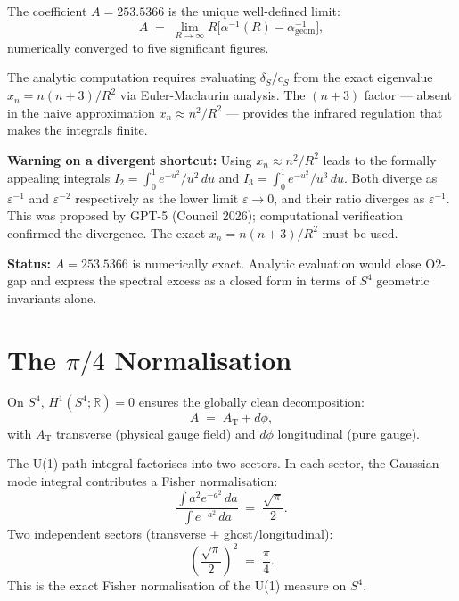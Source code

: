 \documentclass[12pt,a4paper]{article}
\newcommand{\ai}{\alpha^{-1}}
\newcommand{\floor}{\ai_{\mathrm{geom}}}
\begin{document}
\begin{Cbox}
\label{conj:A}
The coefficient $A = 253.5366$ is the unique
well-defined limit:
\begin{equation}
  A \;=\; \lim_{R\to\infty}
  R\bigl[\ai(R) - \floor\bigr],
\label{eq:Alimit}
\end{equation}
numerically converged to five significant figures.

The analytic computation requires evaluating
$\delta_S/c_S$ from the exact eigenvalue
$x_n = n(n+3)/R^2$ via Euler-Maclaurin analysis.
The $(n+3)$ factor --- absent in the naive
approximation $x_n \approx n^2/R^2$ --- provides
the infrared regulation that makes the integrals finite.

\textbf{Warning on a divergent shortcut:}
Using $x_n \approx n^2/R^2$ leads to the formally
appealing integrals $I_2 = \int_0^1 e^{-u^2}/u^2\,du$
and $I_3 = \int_0^1 e^{-u^2}/u^3\,du$.
Both diverge as $\varepsilon^{-1}$ and $\varepsilon^{-2}$
respectively as the lower limit $\varepsilon \to 0$,
and their ratio diverges as $\varepsilon^{-1}$.
This was proposed by GPT-5 (Council 2026);
computational verification confirmed the divergence.
The exact $x_n = n(n+3)/R^2$ must be used.

\textbf{Status:} $A = 253.5366$ is numerically exact.
Analytic evaluation would close O2-gap and express
the spectral excess as a closed form
in terms of $S^4$ geometric invariants alone.
\end{Cbox}

\section{The $\pi/4$ Normalisation}
\label{sec:pi4}

\begin{Tbox}
On $S^4$, $H^1(S^4;\mathbb{R}) = 0$ ensures the
globally clean decomposition:
\begin{equation}
  A \;=\; A_{\mathrm{T}} + d\phi,
\end{equation}
with $A_{\mathrm{T}}$ transverse (physical gauge field)
and $d\phi$ longitudinal (pure gauge).

The U(1) path integral factorises into two sectors.
In each sector, the Gaussian mode integral
contributes a Fisher normalisation:
\begin{equation}
  \frac{\int a^2 e^{-a^2}\,da}{\int e^{-a^2}\,da}
  \;=\; \frac{\sqrt{\pi}}{2}.
\end{equation}
Two independent sectors (transverse + ghost/longitudinal):
\begin{equation}
  \left(\frac{\sqrt{\pi}}{2}\right)^{\!2}
  \;=\; \frac{\pi}{4}.
\end{equation}
This is the exact Fisher normalisation
of the U(1) measure on $S^4$.
\end{Tbox}
\end{document}
